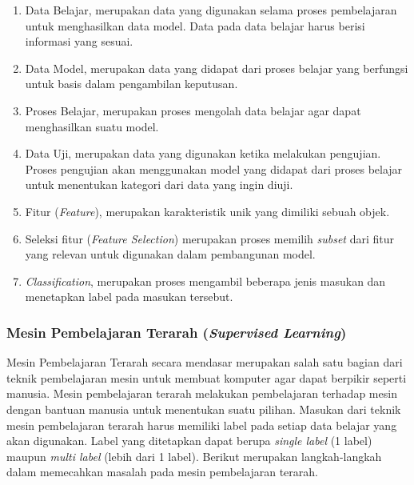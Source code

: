 \begin{enumerate}[nolistsep,leftmargin=0.5cm]
\item
Data Belajar, merupakan data yang digunakan selama proses pembelajaran untuk menghasilkan data model. Data pada data belajar harus berisi informasi yang sesuai.
\item
Data Model, merupakan data yang didapat dari proses belajar yang berfungsi untuk basis dalam pengambilan keputusan.
\item
Proses Belajar, merupakan proses mengolah data belajar agar dapat menghasilkan suatu model.
\item
Data Uji, merupakan data yang digunakan ketika melakukan pengujian. Proses pengujian akan menggunakan model yang didapat dari proses belajar untuk menentukan kategori dari data yang ingin diuji.
\item
Fitur ({\itshape Feature}), merupakan karakteristik unik yang dimiliki sebuah objek.
\item
Seleksi fitur ({\itshape Feature Selection}) merupakan proses memilih {\itshape subset} dari fitur yang relevan untuk digunakan dalam pembangunan model.
\item
{\itshape Classification}, merupakan proses mengambil beberapa jenis masukan dan menetapkan label pada masukan tersebut.
\end{enumerate}

\subsubsection{Mesin Pembelajaran Terarah ({\itshape Supervised Learning})}
\indent
Mesin Pembelajaran Terarah secara mendasar merupakan salah satu bagian dari teknik pembelajaran mesin untuk membuat komputer agar dapat berpikir seperti manusia. Mesin pembelajaran terarah melakukan pembelajaran terhadap mesin dengan bantuan manusia untuk menentukan suatu pilihan. Masukan dari teknik mesin pembelajaran terarah harus memiliki label pada setiap data belajar yang akan digunakan. Label yang ditetapkan dapat berupa {\itshape single label} (1 label) maupun {\itshape multi label} (lebih dari 1 label). Berikut merupakan langkah-langkah dalam memecahkan masalah pada mesin pembelajaran terarah.

